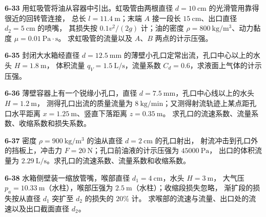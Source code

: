 \begin{ti}
\item[\textbf{6-33}] 用虹吸管将油从容器中引出。虹吸管由两根直径 $d=10\ \mathrm{cm}$ 的光滑管用靠得很近的回转管连接，
总长 $l=11.4\ \mathrm{m}$；末端 $A$ 接一段长 $15\ \mathrm{cm}$、出口直径 $d_2=5\ \mathrm{cm}$ 的喷嘴，
其损失按 $0.1v^2/(2g)$ 计；油的密度 $\rho=800\ \mathrm{kg/m^3}$、动力黏度 $\mu=0.01\ \mathrm{Pa\cdot s}$。
求虹吸管的流量以及 $A$、$B$ 两点的计示压强。
\quad{}\quad{}

\item[\textbf{6-35}] 封闭大水箱经直径 $d=12.5\ \mathrm{mm}$ 的薄壁小孔口定常出流，孔口中心以上的水头 $H=1.8\ \mathrm{m}$，
体积流量 $q_V=1.5\ \mathrm{L/s}$，流量系数 $C_d=0.6$，求液面上气体的计示压强。
\quad{}\quad{}

\item[\textbf{6-36}] 薄壁容器上有一个锐缘小孔口，直径 $d=7.5\ \mathrm{mm}$，孔口中心线以上的水头 $H=1.2\ \mathrm{m}$，
测得孔口出流的质量流量为 $8\ \mathrm{kg/min}$；又测得射流轨迹上某点距孔口水平距离 $x=1.25\ \mathrm{m}$、竖直下落距离 $z=0.35\ \mathrm{m}$。
求孔口的流速系数、流量系数、收缩系数和损失系数。
\quad{}\quad{}

\item[\textbf{6-37}] 密度 $\rho=900\ \mathrm{kg/m^3}$ 的油从直径 $d=2\ \mathrm{cm}$ 的孔口射出，
射流冲击到孔口外的挡板上，冲击力 $F=20\ \mathrm{N}$；孔口前油液的计示压强为 $45000\ \mathrm{Pa}$，
出口的体积流量为 $2.29\ \mathrm{L/s}$。求孔口的流速系数、流量系数和收缩系数。
\quad{}\quad{}

\item[\textbf{6-38}] 水箱侧壁装一缩放管嘴，喉部直径 $d_1=4\ \mathrm{cm}$，水头 $H=3\ \mathrm{m}$，
大气压 $p_a=10.33\ \mathrm{m}$（水柱），喉部压强为 $2.5\ \mathrm{m}$（水柱）；收缩段损失忽略，
渐扩段的损失按从直径 $d_1$ 突扩至 $d_2$ 的损失的 $20\%$ 计。
求喉部的流速与流量、出口处的流速以及出口截面直径 $d_2$。
\quad{}\quad{}


\end{ti}
